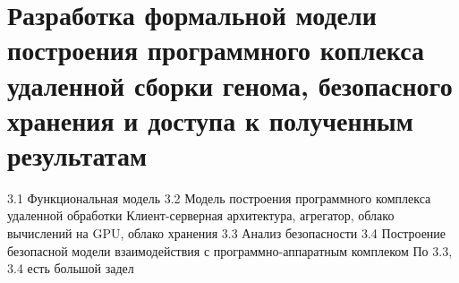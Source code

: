 \chapter{Разработка формальной модели построения программного коплекса удаленной сборки генома, безопасного хранения и доступа к полученным результатам}
    3.1 Функциональная модель
	3.2 Модель построения программного комплекса удаленной обработки
	Клиент-серверная архитектура, агрегатор, облако вычислений на GPU, облако хранения
	3.3 Анализ безопасности
	3.4 Построение безопасной модели взаимодействия с программно-аппаратным комплеком
	По 3.3, 3.4 есть большой задел
